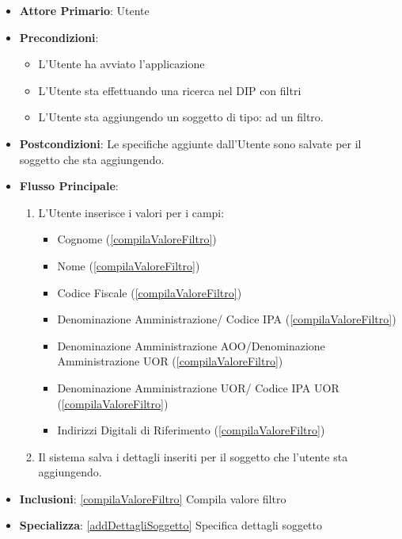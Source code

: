 \begin{itemize}
      \item \textbf{Attore Primario}: Utente
      \item \textbf{Precondizioni}: \begin{itemize}
            \item L'Utente ha avviato l'applicazione
            \item L'Utente sta effettuando una ricerca nel DIP con filtri
            \item L'Utente sta aggiungendo un soggetto di tipo:  ad un filtro.
      \end{itemize}
      \item \textbf{Postcondizioni}:  Le specifiche aggiunte dall'Utente sono salvate per il soggetto che sta aggiungendo.
      \item \textbf{Flusso Principale}:
            \begin{enumerate}
                  \item L'Utente inserisce i valori per i campi:
                        \begin{itemize}
                              \item Cognome (\ref{compilaValoreFiltro})
                              \item Nome (\ref{compilaValoreFiltro})
                              \item Codice Fiscale (\ref{compilaValoreFiltro})
                              \item Denominazione Amministrazione/ Codice IPA (\ref{compilaValoreFiltro})
                              \item Denominazione Amministrazione AOO/Denominazione Amministrazione UOR (\ref{compilaValoreFiltro})
                              \item  Denominazione Amministrazione UOR/ Codice IPA UOR (\ref{compilaValoreFiltro})
                              \item Indirizzi Digitali di Riferimento (\ref{compilaValoreFiltro})
                        \end{itemize}
                  \item Il sistema salva i dettagli inseriti per il soggetto che l'utente sta aggiungendo.
            \end{enumerate}
      \item \textbf{Inclusioni}: \ref{compilaValoreFiltro} Compila valore filtro
      \item \textbf{Specializza}: \ref{addDettagliSoggetto} Specifica dettagli soggetto
\end{itemize}

